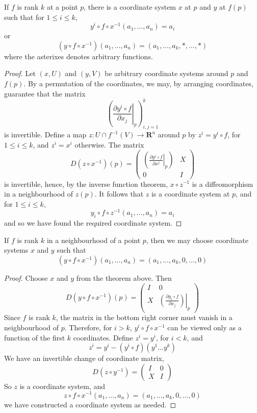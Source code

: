 \begin{theorem}
    If $f$ is rank $k$ at a point $p$, there is a coordinate system $x$ at $p$ and $y$ at $f(p)$ such that for $1 \leq i \leq k$,
    \[ y^i \circ f \circ x^{-1}(a_1, \dots, a_n) = a_i \]
    or
    \[ (y \circ f \circ x^{-1})(a_1, \dots, a_n) = (a_1, \dots, a_k, *,\dots, *) \]
    where the asterixes denotes arbitrary functions.
\end{theorem}
\begin{proof}
    Let $(x,U)$ and $(y,V)$ be arbitrary coordinate systems around $p$ and $f(p)$. By a permutation of the coordinates, we may, by arranging coordinates, guarantee that the matrix
    \[ \left( \left.\frac{\partial y^i \circ f}{\partial x_j}\right|_p \right)_{i,j = 1}^k \]
    is invertible. Define a map $z:U \cap f^{-1}(V) \to \mathbf{R}^n$ around $p$ by $z^i = y^i \circ f$, for $1 \leq i \leq k$, and $z^i = x^i$ otherwise. The matrix
    \[ D(z \circ x^{-1})(p) = \begin{pmatrix} \left( \left.\frac{\partial y^i \circ f}{\partial x^j}\right|_p \right) & X \\ 0 & I \end{pmatrix} \]
    is invertible, hence, by the inverse function theorem, $x \circ z^{-1}$ is a diffeomorphism in a neighbourhood of $z(p)$. It follows that $z$ is a coordinate system at $p$, and for $1 \leq i \leq k$,
    \[ y_i \circ f \circ z^{-1}(a_1, \dots, a_n) = a_i \]
    and so we have found the required coordinate system.
\end{proof}

\begin{corollary}
    If $f$ is rank $k$ in a neighbourhood of a point $p$, then we may choose coordinate systems $x$ and $y$ such that
    \[ (y \circ f \circ x^{-1})(a_1, \dots, a_n) = (a_1, \dots, a_k, 0, \dots, 0) \]
\end{corollary}
\begin{proof}
    Choose $x$ and $y$ from the theorem above. Then
    \[ D(y \circ f \circ x^{-1})(p) = \begin{pmatrix} I & 0 \\ X & \left.\left( \frac{\partial y_i \circ f}{\partial x_j} \right)\right|_p \end{pmatrix} \]
    Since $f$ is rank $k$, the matrix in the bottom right corner must vanish in a neighbourhood of $p$. Therefore, for $i > k$, $y^i \circ f \circ x^{-1}$ can be viewed only as a function of the first $k$ coordinates. Define $z^i = y^i$, for $i < k$, and
    \[ z^i = y^i - (y^i \circ f)(y^1 \dots y^k) \]
    We have an invertible change of coordinate matrix,
    \[ D(z \circ y^{-1}) = \begin{pmatrix} I & 0 \\ X & I \end{pmatrix} \]
    So $z$ is a coordinate system, and
    \[ z \circ f \circ x^{-1}(a_1, \dots, a_n) = (a_1, \dots, a_k, 0, \dots, 0) \]
    we have constructed a coordinate system as needed.
\end{proof}

